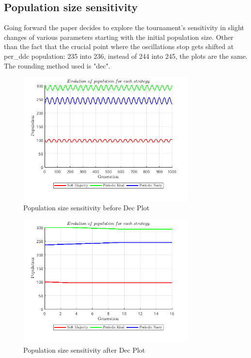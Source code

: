 \subsection{Population size sensitivity}
Going forward the paper decides to explore the tournament's sensitivity in slight changes of various parameters starting with the initial population size. Other than the fact that the crucial point where the oscillations stop gets shifted at per_ddc population: 235 into 236, instead of 244 into 245, the plots are the same. The rounding method used is "dec".
\begin{figure}[H]
    \centering
    \includegraphics[width=0.8\textwidth]{media/meetings/population_size_sensitivity_before_dec.png}
    \caption{Population size sensitivity before Dec Plot}
\end{figure}
\begin{figure}[H]
    \centering
    \includegraphics[width=0.8\textwidth]{media/meetings/population_size_sensitivity_after_dec.png}
    \caption{Population size sensitivity after Dec Plot}
\end{figure}


